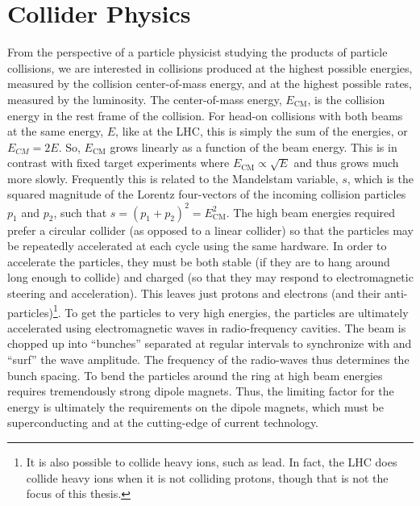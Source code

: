 \section{Collider Physics}
\label{sec:lhc_collider_physics}

From the perspective
of a particle physicist studying the products of particle collisions, we 
are interested in collisions produced at the highest possible energies,
measured by the collision center-of-mass energy, and at the highest possible rates, 
measured by the luminosity.
The center-of-mass energy, $E_{\textrm{CM}}$, is the collision energy 
in the rest frame
of the collision. For head-on collisions with both beams at the same
energy, $E$, like at the LHC, this is simply the sum of the energies, 
or $E_{CM} = 2 E$. So, $E_{\textrm{CM}}$ grows linearly as a function
of the beam energy. This is in contrast with fixed target experiments
where $E_{\textrm{CM}} \propto \sqrt{E}$ and thus grows much more slowly. 
Frequently this is related to the Mandelstam variable,
$s$, which is the squared magnitude of the Lorentz four-vectors
of the incoming collision particles $p_1$ and $p_2$, such that
$s = (p_1+p_2)^2 = E_\textrm{CM}^2$.
The high beam energies required prefer a circular collider (as opposed
to a linear collider) so that the particles may be repeatedly 
accelerated at each cycle using the same hardware.
In order to accelerate the particles, they must be both stable (if they
are to hang around long enough to collide) and charged (so
that they may respond to electromagnetic steering and acceleration).
This leaves just protons and electrons (and their anti-particles)\footnote{It is also
possible to collide heavy ions, such as lead. In fact, the LHC does collide
heavy ions when it is not colliding protons, though that is not the focus of this
thesis.}.
To get the particles to very high energies, the particles
are ultimately accelerated using electromagnetic waves in radio-frequency cavities.
The beam is chopped up into ``bunches'' separated at regular intervals
to synchronize with and ``surf'' the wave amplitude. The frequency
of the radio-waves thus determines the bunch spacing.
To bend the particles around the ring at high beam energies 
requires tremendously strong dipole magnets. 
Thus, the limiting factor for the energy is ultimately the requirements
on the dipole magnets, which must be superconducting and at the cutting-edge 
of current technology.

